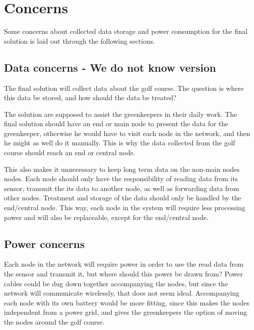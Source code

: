 \section{Concerns}
Some concerns about collected data storage and power consumption for the final solution is laid out through the following sections.

\subsection{Data concerns - We do not know version}
The final solution will collect data about the golf course. The question is where this data be stored, and how should the data be treated?

The solution are supposed to assist the greenkeepers in their daily work. The final solution should have an end or main node to present the data for the greenkeeper, otherwise he would have to visit each node in the network, and then he might as well do it manually. This is why the data collected from the golf course should reach an end or central node.

This also makes it unnecessary to keep long term data on the non-main nodes nodes. Each node should only have the responsibility of reading data from its sensor, transmit the its data to another node, as well as forwarding data from other nodes. Treatment and storage of the data should only be handled by the end/central node. This way, each node in the system will require less processing power and will also be replaceable, except for the end/central node.



\subsection{Power concerns}

Each node in the network will require power in order to use the read data from the sensor and transmit it, but where should this power be drawn from? Power cables could be dug down together accompanying the nodes, but since the network will communicate wirelessly, that does not seem ideal. Accompanying each node with its own battery would be more fitting, since this makes the nodes independent from a power grid, and gives the greenkeepers the option of moving the nodes around the golf course.



